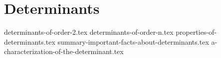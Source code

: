 \chapter{Determinants}\label{Chapter 4}
{determinants-of-order-2.tex}
{determinants-of-order-n.tex}
{properties-of-determinants.tex}
{summary-important-facts-about-determinants.tex}
{a-characterization-of-the-determinant.tex}
